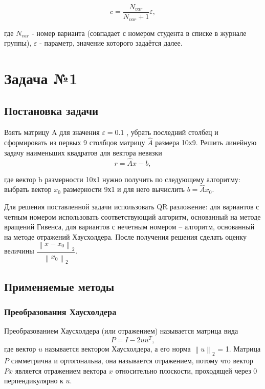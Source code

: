 \documentclass[a4paper]{article}
\begin{document}
\begin{equation*}
c = \frac{N_{var}}{N_{var} + 1}\varepsilon,
\end{equation*}

где $N_{var}$ - номер варианта (совпадает с номером студента в списке в журнале группы), $\varepsilon$  - параметр, значение которого задаётся далее.

\newpage

\section{Задача №1}

\subsection{Постановка задачи}
Взять матрицу A  для значения $\varepsilon = 0.1$ , убрать последний столбец и сформировать из первых 9 столбцов матрицу $\hat{A}$  размера 10х9. Решить линейную задачу наименьших квадратов для вектора невязки
\begin{equation*}
r = \hat{A} x - b,
\end{equation*}

где вектор b размерности 10х1 нужно получить по следующему алгоритму: выбрать вектор $x_0$  размерности 9х1 и для него вычислить $b = \hat{A} x_0$.

Для решения поставленной задачи использовать QR разложение: для вариантов с четным номером использовать соответствующий алгоритм, основанный на методе вращений Гивенса, для вариантов с нечетным номером – алгоритм, основанный на методе отражений Хаусхолдера. 
После получения решения сделать оценку величины $\dfrac{\left \| x - x_0 \right \|_{2}} {\left \| x_0 \right \|_{2}}$.

\newpage

\subsection{Применяемые методы}

\subsubsection{Преобразования Хаусхолдера}

Преобразованием Хаусхолдера (или отражением) называется матрица вида
\begin{equation}\label{matrix_house}
P = I - 2 u u^{T},
\end{equation}
где вектор $u$ называется вектором Хаусхолдера, а его норма $\left \| u \right \|_2$ = 1. Матрица $P$ симметрична и ортогональна, она называется отражением, потому что вектор $Px$ является отражением вектора $x$ относительно плоскости, проходящей через 0 перпендикулярно к $u$. 
\end{document}
